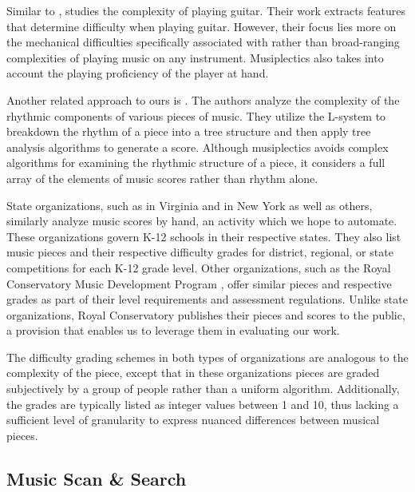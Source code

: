 \documentclass[10pt,preprint]{sigplanconf}
\begin{document}
Similar to \cite{Chiu2012}, \cite{Heijink2002} studies the complexity of playing guitar. Their work extracts features that determine difficulty when playing guitar. However, their focus lies more on the mechanical difficulties specifically associated with  rather than broad-ranging complexities of playing music on any instrument. Musiplectics also takes into account the playing proficiency of the player at hand.

Another related approach to ours is \cite{Liou2010}. The authors analyze the complexity of the rhythmic components of various pieces of music. They utilize the L-system to breakdown the rhythm of a piece into a tree structure and then apply tree analysis algorithms to generate a score. Although musiplectics avoids complex algorithms for examining the rhythmic structure of a piece, it considers a full array of the elements of music scores  rather than rhythm alone.

State organizations, such as \cite{VBODA} in Virginia and \cite{NYSSMA} in New York as well as others, similarly analyze music scores by hand, an activity which we hope to automate. These organizations govern K-12 schools in their respective states. They also list music pieces and their respective difficulty grades for district, regional, or state competitions for each K-12 grade level. Other organizations, such as the Royal Conservatory Music Development Program \cite{RoyalSyllabus}, offer similar pieces and respective grades as part of their level requirements and assessment regulations. Unlike state organizations, Royal Conservatory publishes their pieces and scores to the public, a provision that enables us to leverage them in evaluating our work.

The difficulty grading schemes in both types of organizations are analogous to the complexity of the piece, except that in these organizations pieces are graded subjectively by a group of people rather than a uniform algorithm. Additionally, the grades are typically listed as integer values between 1 and 10, thus lacking a sufficient level of granularity to express nuanced differences between musical pieces.

\subsection{Music Scan \& Search}
\label{sec:relscan}
\end{document}
